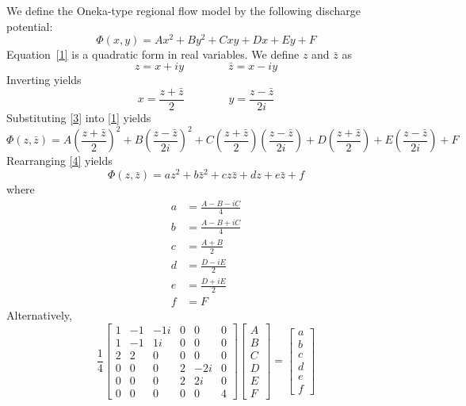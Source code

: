 \documentclass{article}
\begin{document}

We define the Oneka-type regional flow model by the following discharge potential:
%
\begin{equation}\label{1}
    \Phi(x,y) = A x^2 + B y^2 + C xy + Dx + Ey + F
\end{equation}
%
Equation~\eqref{1} is a quadratic form in real variables. We define $z$ and $\bar{z}$ as
%
\begin{equation}\label{2}
    z = x + i y \qquad \qquad \bar{z} = x - i y
\end{equation}
%
Inverting yields
%
\begin{equation}\label{3}
    x = \frac{z + \bar{z}}{2} \qquad \qquad y = \frac{z - \bar{z}}{2i}
\end{equation}
%
Substituting \eqref{3} into \eqref{1} yields
%
\begin{equation}\label{4}
    \Phi(z,\bar{z})
    = A \left(\frac{z + \bar{z}}{2}\right)^2 + B \left(\frac{z - \bar{z}}{2i}\right)^2 +
        C \left(\frac{z + \bar{z}}{2}\right)\left(\frac{z - \bar{z}}{2i}\right) +
        D \left(\frac{z + \bar{z}}{2}\right) + E \left(\frac{z - \bar{z}}{2i}\right) + F
\end{equation}
%
Rearranging \eqref{4} yields
%
\begin{equation}\label{5}
    \Phi(z, \bar{z}) = a z^2 + b \bar{z}^2 + c z \bar{z} + d z + e \bar{z} + f
\end{equation}
%
where
%
\begin{align}
    a &= \frac{A - B - iC}{4} \\
    b &= \frac{A - B + iC}{4} \\
    c &= \frac{A + B}{2} \\
    d &= \frac{D - iE}{2} \\
    e &= \frac{D + iE}{2} \\
    f &= F
\end{align}
%
Alternatively,
%
\begin{equation}
    \frac{1}{4}
    \begin{bmatrix}
    1& -1& -1i& 0& 0& 0 \\
	1& -1& 1i& 0& 0& 0 \\
	2& 2& 0& 0& 0& 0 \\
	0& 0& 0& 2& -2i& 0 \\
	0& 0& 0& 2& 2i& 0 \\
	0& 0& 0& 0& 0& 4
    \end{bmatrix}
    \begin{bmatrix}A \\ B \\ C \\ D \\ E \\ F \end{bmatrix}
    =
    \begin{bmatrix}a \\ b \\ c \\ d \\ e \\ f \end{bmatrix}
\end{equation}
\end{document}
